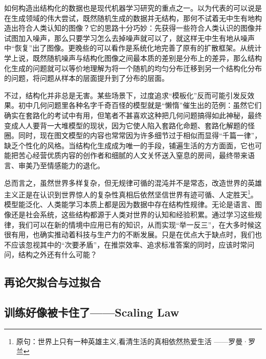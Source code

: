 如何构造出结构化的数据也是现代机器学习研究的重点之一。以为代表的可以说是在生成领域的伟大尝试，既然随机生成的数据并无结构，那何不试着无中生有地构造出符合人类认知的图像？它的思路十分巧妙：先获得一些符合人类认识的图像并试图加入噪声，那么只要学习怎么去掉噪声就可以了，就这样无中生有地从噪声中“恢复”出了图像。更晚些的可以看作是系统化地完善了原有的扩散框架。从统计学上说，既然随机噪声与结构化图像之间最本质的差别是分布上的差异，那么结构化生成的问题就可以等价地理解为将一个随机的均匀分布迁移到另一个结构化分布的问题，将问题从样本的层面提升到了分布的层面。

不过，结构化并非总是无害。某些场景下，过度追求“模板化”反而可能引发反效果。初中几何问题里各种名字千奇百怪的模型就是“懒惰”催生出的范例：虽然它们确实在套路化的考试中有用，但笔者不甚喜欢这种把几何问题搞得如此神秘，最终变成人人要背一大堆模型的现状，因为它使人陷入套路化命题、套路化解题的怪圈。同时，现在图文模型的内容也常常因为许多细节过于相似而显得“千篇一律”，缺乏个性化的风格。当结构化生成成为唯一的手段，铺遍生活的方方面面，它也可能把苦心经营优质内容的创作者和细腻的人文关怀送入窒息的房间，最终带来语言、审美乃至情感能力的退化。

总而言之，虽然世界多样复杂，但无规律可循的混沌并不是常态，改造世界的英雄主义正是在认识到世界惊人的复杂性真相后依然坚信世界有迹可循、人定胜天\footnote{原句：世界上只有一种英雄主义,看清生活的真相依然热爱生活 ——罗曼·罗兰}。模型能泛化、人类能学习本质上都是因为数据中存在结构性规律。无论是语言、图像还是社会系统，这些结构都源于人类对世界的认知和经验积累。通过学习这些规律，我们可以在新的情境中应用已有的知识，从而实现“举一反三”，在大多时候这很有用，也确实推动着科技与生产力的不断发展。只是在优点大于缺点时，我们也不应该忽视其中的“次要矛盾”，在推崇效率、追求标准答案的同时，应该时常问问，结构之外还有什么可能？

\newpage

\subsection{再论欠拟合与过拟合}

\subsection{训练好像被卡住了——Scaling Law}
